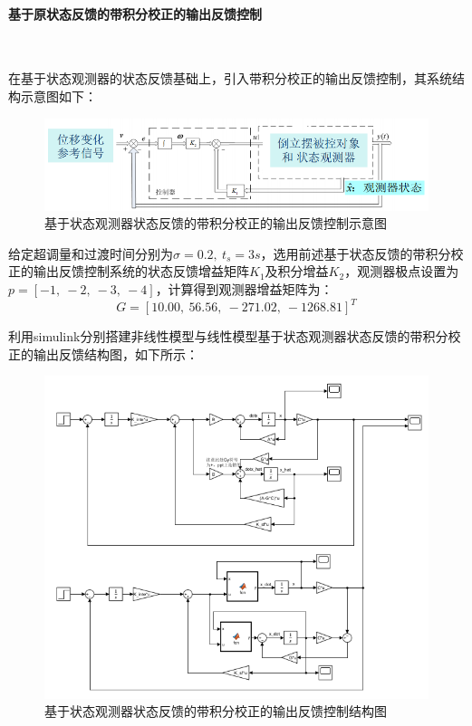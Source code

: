 \documentclass[UTF8]{article}
\begin{document}
\paragraph{基于原状态反馈的带积分校正的输出反馈控制}~{}


在基于状态观测器的状态反馈基础上，引入带积分校正的输出反馈控制，其系统结构示意图如下：
\begin{figure}[H]
    \centering %
    \includegraphics[width=.6\textwidth]{figure/倒立摆-积分校正-状态反馈-结构图示意.png}
    \caption{基于状态观测器状态反馈的带积分校正的输出反馈控制示意图} %
\end{figure}

给定超调量和过渡时间分别为$\sigma = 0.2,\ t_s = 3s$，选用前述基于状态反馈的带积分校正的输出反馈控制系统的状态反馈增益矩阵$K_1$及积分增益$K_2$，观测器极点设置为$p = [-1,\ -2,\ -3,\ -4]$，计算得到观测器增益矩阵为：
\begin{equation*}
	G = [10.00,\ 56.56,\ -271.02,\ -1268.81]^T
\end{equation*}

利用simulink分别搭建非线性模型与线性模型基于状态观测器状态反馈的带积分校正的输出反馈结构图，如下所示：
\begin{figure}[H]
    \centering %
    \includegraphics[width=.6\textwidth]{figure/倒立摆-积分校正-状态反馈-结构图.png}
    \caption{基于状态观测器状态反馈的带积分校正的输出反馈控制结构图} %
\end{figure}
\end{document}
